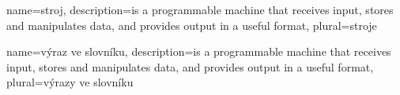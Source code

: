 {
  name={stroj},
  description={is a programmable machine that receives input,
               stores and manipulates data, and provides
               output in a useful format},
  plural={stroje}
}

{
  name={výraz ve slovníku},
  description={is a programmable machine that receives input,
               stores and manipulates data, and provides
               output in a useful format},
  plural={výrazy ve slovníku}
}